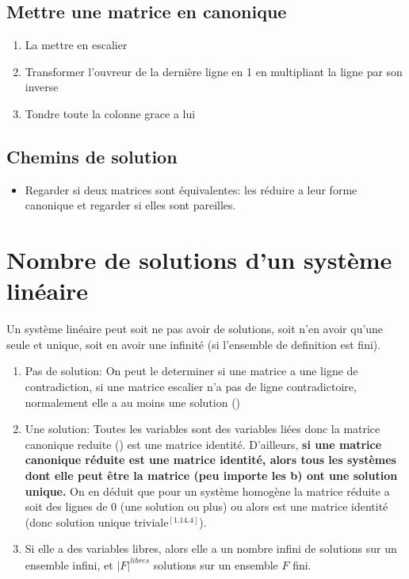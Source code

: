 \documentclass[12pt]{article}
\begin{document}
\subsection{Mettre une matrice en canonique}
\begin{enumerate}
  \item La mettre en escalier
  \item Transformer l'ouvreur de la dernière ligne en 1 en multipliant la ligne par son inverse
  \item Tondre toute la colonne grace a lui
\end{enumerate}
  

\subsection{Chemins de solution}
\begin{itemize}
  \item Regarder si deux matrices sont équivalentes: les réduire a leur forme canonique et regarder si elles sont pareilles. 
\end{itemize}

\section{Nombre de solutions d'un système linéaire}

Un système linéaire peut soit ne pas avoir de solutions, soit n'en avoir qu'une seule et unique, soit en avoir une infinité (si l'ensemble de definition est fini). 
\begin{enumerate}
  \item Pas de solution: On peut le determiner si une matrice a une ligne de contradiction, si une matrice escalier n'a pas de ligne contradictoire, normalement elle a au moins une solution ()
  \item Une solution: Toutes les variables sont des variables liées donc la matrice canonique reduite () est une matrice identité. D'ailleurs, \textbf{si une matrice canonique réduite est une matrice identité, alors tous les systèmes dont elle peut être la matrice (peu importe les b) ont une solution unique.} On en déduit que pour un système homogène la matrice réduite a soit des lignes de 0 (une solution ou plus) ou alors est une matrice identité (donc solution unique triviale$^{[1.14.4]}$).
    \item Si elle a des variables libres, alors elle a un nombre infini de solutions sur un ensemble infini, et $| F |^{libres}$ solutions sur un ensemble  $F$ fini.
\end{enumerate}

  
  
\end{document}
